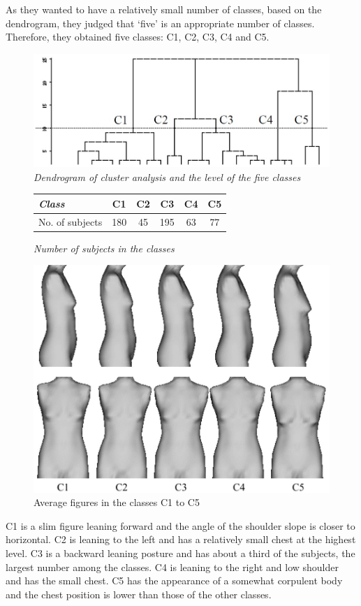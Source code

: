 \documentclass[12pt,a4paper,openany,UKenglish]{scrreprt}
\begin{document}
As they wanted to have a relatively small number of classes, based on the dendrogram, they judged that ‘five’ is an appropriate number of classes. Therefore, they obtained five classes: C1, C2, C3, C4 and C5.
\begin{figure}[H]
	\centering
	\caption{\small\centering\itshape Dendrogram of cluster analysis and the level of the five classes}
	\includegraphics[width=0.9\linewidth]{../Images/Kuro2.jpg}
\end{figure}
\begin{figure}[H]
	\centering
	\caption{\small\centering\itshape Number of subjects in the classes}
	{\small
		\begin{tabular}{lccccc}
			\hline\hline
			\itshape Class  & C1  & C2 & C3  & C4 & C5 \\
			\hline
			No. of subjects & 180 & 45 & 195 & 63 & 77 \\
			\hline\hline
		\end{tabular}}
\end{figure}

\begin{figure}[H]
	\caption{Average figures in the classes C1 to C5}
	\centering
	\includegraphics[width=0.75\linewidth]{../Images/Kuro3.jpg}
\end{figure}
C1 is a slim figure leaning forward and the angle of the shoulder slope is closer to horizontal. C2 is leaning to the left and has a relatively small chest at the highest level. C3 is a backward leaning posture and has about a third of the subjects, the largest number among the classes. C4 is leaning to the right and low shoulder and has the small chest. C5 has the appearance of a somewhat corpulent body and the chest position is lower than those of the other classes.
\end{document}
